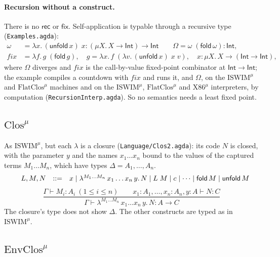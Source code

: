 \documentclass[10pt]{article}
\makeatletter
\theoremstyle{acmplain}
\newcommand{\key}[1]{\mathsf{#1}}
\newcommand{\lam}[1]{\lambda #1.\,}
\newcommand{\clos}[2]{\lambda^{#1}\, #2.\,}
\newcommand{\Ml}[1]{\textrm{#1}^{\mu}}                  %
\newcommand{\Mmu}[2]{\mu #1.\,#2}                         %
\newcommand{\Mfold}{\key{fold}\,}
\newcommand{\Munfold}{\key{unfold}\,}
\newenvironment{syntax}{\[\begin{array}{l@{\quad}rcl}}{\end{array}\]}
\makeatother
\begin{document}
\paragraph{Recursion without a construct.} There is no $\key{rec}$ or
$\key{fix}$. Self-application is typable through a recursive type
(\texttt{Examples.agda}):
\begin{align*}
  \omega &= \lam{x} (\Munfold x)\;x : (\Mmu{X}{X \rightarrow \key{Int}}) \rightarrow \key{Int}
  \qquad \Omega = \omega\;(\Mfold \omega) : \key{Int} , \\
  \mathit{fix} &= \lam{f} g\;(\Mfold g), \quad
    g = \lam{x} f\;(\lam{v} (\Munfold x)\;x\;v), \quad
    x : \Mmu{X}{X \rightarrow (\key{Int} \rightarrow \key{Int})} ,
\end{align*}
where $\Omega$ diverges and $\mathit{fix}$ is the call-by-value fixed-point
combinator at $\key{Int} \rightarrow \key{Int}$; the example compiles a
countdown with $\mathit{fix}$ and runs it, and $\Omega$, on the
$\Ml{ISWIM}$ and $\Ml{FlatClos}$ machines and on the $\Ml{ISWIM}$, $\Ml{FlatClos}$
and $\Ml{X86}$ interpreters, by computation
(\texttt{RecursionInterp.agda}). So no semantics needs a least fixed point.

\subsection{\texorpdfstring{$\Ml{Clos}$}{Clos-mu}}

As $\Ml{ISWIM}$, but each $\lambda$ is a closure
(\texttt{Language/Clos2.agda}): its code $N$ is closed, with the parameter
$y$ and the names $x_1 \ldots x_n$ bound to the values of the captured
terms $M_1 \ldots M_n$, which have types $\Delta = A_1, \ldots, A_n$.
\begin{syntax}
  & L, M, N &::=& x \mid \clos{M_1\ldots M_n}{x_1\ldots x_n\, y} N
    \mid L\;M \mid c \mid \cdots \mid \Mfold M \mid \Munfold M
\end{syntax}
\[
  \frac{\Gamma \vdash M_i : A_i \ (1 \leq i \leq n) \qquad
        x_1{:}A_1, \ldots, x_n{:}A_n, y{:}A \vdash N : C}
       {\Gamma \vdash \clos{M_1\ldots M_n}{x_1\ldots x_n\, y} N : A \rightarrow C}
\]
The closure's type does not show $\Delta$. The other constructs are typed
as in $\Ml{ISWIM}$.

\subsection{\texorpdfstring{$\Ml{EnvClos}$}{EnvClos-mu}}
\end{document}

